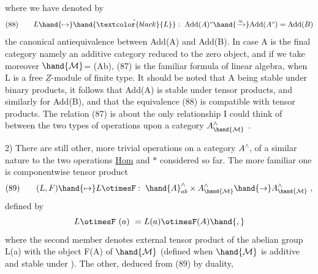 where we have denoted by
\[
(88)\qquad L\hand{\mapsto}\hand{\check{\textcolor{black}{L}}} : \ \mathrm{Add}(A)^{o}\hand{\xrightarrow{\approx}}\mathrm{Add}(A^{o})= \mathrm{Add}(B)
\]
the canonical antiequivalence between Add(A) and Add(B). In case A is
the final category namely an additive category reduced to the zero object,
 and if we take moreover $\hand{\mathcal{M}}$= (Ab), (87) is the familiar formula of
linear algebra,  when L is a free $\underline{Z}$-module of finite type. It should be
noted that A being stable under binary products, it follows that Add(A)
is stable under tensor products, and similarly for Add(B), and that
the equivalence (88) is compatible with tensor products. The relation
(87) is about the only relationship I could think of between the two types
of operations upon a  category $A^{\wedge}_{\hand{\mathcal{M}}}$ . 

2) There are still  other, more trivial operations on a category $A^{\wedge}$,
of a  similar nature to the two operations \uline{Hom} and $*$ considered so
far. The more familiar one is componentwise tensor product
\[
(89)\qquad (L,F)\hand{\mapsto} L\otimesF : \ \hand{A}^{\wedge}_{ab}\times A^{\wedge}_{\hand{\mathcal{M}}}\hand{\to} A^{\wedge}_{\hand{\mathcal{M}}} \ ,
\]
defined by
\[
L\otimesF\ (a) \ = L(a)\otimesF(A)\hand{,}
\]
where the second member denotes external tensor product of the abelian
group L(a) with the object F(A) of $\hand{\mathcal{M}}$ (defined when $\hand{\mathcal{M}}$ is additive and
stable under ). The other, deduced from (89) by duality,

